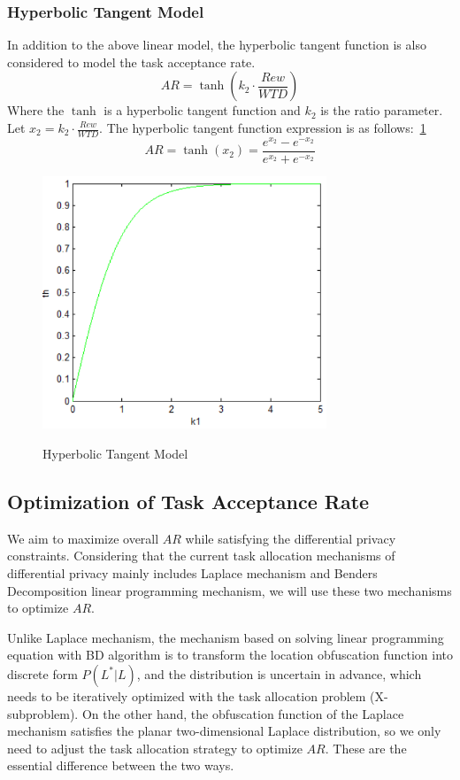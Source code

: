 \subsubsection{Hyperbolic Tangent Model}
In addition to the above linear model, the hyperbolic tangent function is also considered to model the task acceptance rate.
$$
	AR=\tanh (k_2 \cdot \frac{Rew}{WTD})
$$
Where the $\tanh$ is a hyperbolic tangent function and $k_2$ is the ratio parameter. Let $x_2=k_2 \cdot \frac{Rew}{WTD}$. The hyperbolic tangent function expression is as follows:~\ref{img:TanhModel}
$$
	AR=\tanh (x_2)=\frac{e^{x_2}-e^{-x_2}}{e^{x_2}+e^{-x_2}}
$$

\begin{figure}
\includegraphics[width=8.5cm]{TanhModel}
\label{img:TanhModel}
\caption{Hyperbolic Tangent Model}
\end{figure}

\subsection{Optimization of Task Acceptance Rate}
We aim to maximize overall $AR$ while satisfying the differential privacy constraints. Considering that the current task allocation mechanisms of differential privacy mainly includes Laplace mechanism and Benders Decomposition linear programming mechanism, we will use these two mechanisms to optimize $AR$.

Unlike Laplace mechanism, the mechanism based on solving linear programming equation with BD algorithm is to transform the location obfuscation function into discrete form $P(L^*|L)$, and the distribution is uncertain in advance, which needs to be iteratively optimized with the task allocation problem (X-subproblem). On the other hand, the obfuscation function of the Laplace mechanism satisfies the planar two-dimensional Laplace distribution, so we only need to adjust the task allocation strategy to optimize $AR$. These are the essential difference between the two ways.

